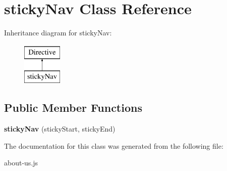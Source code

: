 \hypertarget{classstickyNav}{\section{sticky\-Nav Class Reference}
\label{classstickyNav}
}
Inheritance diagram for sticky\-Nav\-:\begin{figure}[H]
\begin{center}
\leavevmode
\includegraphics[height=2.000000cm]{classstickyNav}
\end{center}
\end{figure}
\subsection*{Public Member Functions}
\begin{DoxyCompactItemize}
\item 
\hypertarget{classstickyNav_a59cd9d060356477138c7969b164ca52b}{{\bfseries sticky\-Nav} (sticky\-Start, sticky\-End)}\label{classstickyNav_a59cd9d060356477138c7969b164ca52b}

\end{DoxyCompactItemize}


The documentation for this class was generated from the following file\-:\begin{DoxyCompactItemize}
\item 
about-\/us.\-js\end{DoxyCompactItemize}
